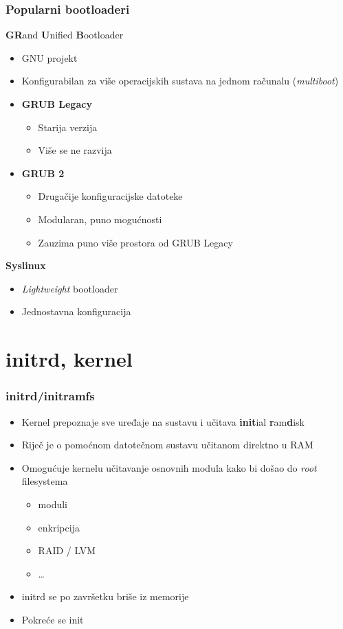 \documentclass[t]{beamer}
\begin{document}
\begin{frame}
	\frametitle{Popularni bootloaderi}
	\textbf{GR}and \textbf{U}nified \textbf{B}ootloader
	\begin{itemize}
		\item GNU projekt
		\item Konfigurabilan za više operacijskih sustava na jednom računalu (\textit{multiboot})
	\end{itemize}
	\begin{itemize}
		\item \textbf{GRUB Legacy}
		\begin{itemize}
			\item Starija verzija
			\item Više se ne razvija
		\end{itemize}
		\item \textbf{GRUB 2}
		\begin{itemize}
			\item Drugačije konfiguracijske datoteke
			\item Modularan, puno mogućnosti
			\item Zauzima puno više prostora od GRUB Legacy
		\end{itemize}
	\end{itemize}
	\vfill
	\textbf{Syslinux}
	\begin{itemize}
		\item \emph{Lightweight} bootloader
		\item Jednostavna konfiguracija
	\end{itemize}
\end{frame}



\section{initrd, kernel}
\begin{frame}
	\frametitle{initrd/initramfs}
	\begin{itemize}
		\item Kernel prepoznaje sve uređaje na sustavu i učitava \textbf{init}ial \textbf{r}am\textbf{d}isk
		\item Riječ je o pomoćnom datotečnom sustavu učitanom direktno u RAM
		\item Omogućuje kernelu učitavanje osnovnih modula kako bi došao do \emph{root} filesystema
		\begin{itemize}
			\item moduli
			\item enkripcija
			\item RAID / LVM
			\item \dots
		\end{itemize}
		\item initrd se po završetku briše iz memorije
		\item Pokreće se init
	\end{itemize}
\end{frame}
\end{document}
